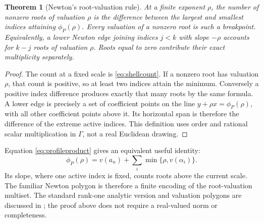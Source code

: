 \documentclass[11pt,letterpaper]{article}
\numberwithin{equation}{section}
\newtheorem{theorem}{Theorem}[section]
\theoremstyle{definition}
\theoremstyle{remark}\newtheorem{remark}[theorem]{Remark}
\begin{document}
\begin{theorem}[Newton's root-valuation rule]\label{thm:newton}
At a finite exponent $\rho$, the number of nonzero roots of valuation
$\rho$ is the difference between the largest and smallest indices
attaining $\phi_P(\rho)$. Every valuation of a nonzero root is such a
breakpoint. Equivalently, a lower Newton edge joining indices $j<k$
with slope $-\rho$ accounts for $k-j$ roots of valuation $\rho$.
Roots equal to zero contribute their exact multiplicity separately.
\end{theorem}
\begin{proof}
The count at a fixed scale is \eqref{eq:shellcount}. If a nonzero root
has valuation $\rho$, that count is positive, so at least two indices
attain the minimum. Conversely a positive index difference produces
exactly that many roots by the same formula. A lower edge is precisely
a set of coefficient points on the line $y+\rho x=\phi_P(\rho)$,
with all other coefficient points above it. Its horizontal span is
therefore the difference of the extreme active indices. This definition
uses order and rational scalar multiplication in $\Gamma$, not a real
Euclidean drawing.
\end{proof}
Equation \eqref{eq:profileproduct} gives an equivalent useful identity:
\[
 \phi_P(\rho)=v(a_n)+\sum_i\min\{\rho,v(\alpha_i)\}.
\]
Its slope, where one active index is fixed, counts roots above the
current scale. The familiar Newton polygon is therefore a finite
encoding of the root-valuation multiset. The standard rank-one analytic
version and valuation polygons are discussed in \cite[\S3]{Benedetto};
the proof above does not require a real-valued norm or completeness.
\end{document}
